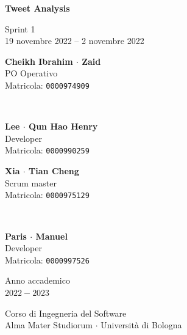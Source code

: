 \documentclass[11pt]{article}
\begin{document}
\begin{titlepage}
    \begin{center}
        \vspace*{1.5cm}
            
        \Huge
        \textbf{Tweet Analysis}
            
        \vspace{0.3cm}
        \LARGE
        Sprint 1\\[0.2em]
        \Large
        19 novembre 2022 -- 2 novembre 2022

        \vspace{1.5cm}
          
        \begin{minipage}[t]{0.47\textwidth}
            \begin{center}
                \parbox{50mm}{\centering\large {\bf Cheikh Ibrahim $\cdot$ Zaid} \\[0.2em] PO Operativo \\[0.3em] Matricola: \texttt{0000974909}}\\[2em]
                \parbox{50mm}{\centering\large {\bf Lee $\cdot$ Qun Hao Henry} \\[0.2em] Developer \\[0.3em] Matricola: \texttt{0000990259}}
            \end{center}
		\end{minipage}
		\hfill
		\begin{minipage}[t]{0.47\textwidth}\raggedleft
            \begin{center}
                \parbox{50mm}{\centering\large {\bf Xia $\cdot$ Tian Cheng} \\[0.2em] Scrum master \\[0.3em] Matricola: \texttt{0000975129}}\\[2em]
                \parbox{50mm}{\centering\large {\bf Paris $\cdot$ Manuel} \\[0.2em] Developer \\[0.3em] Matricola: \texttt{0000997526}}
            \end{center}
		\end{minipage}  
            
        \vspace{6cm}
            
        Anno accademico\\
        $2022 - 2023$
            
        \vspace{0.8cm}
            
            
        \Large
        Corso di Ingegneria del Software\\
        Alma Mater Studiorum $\cdot$ Università di Bologna\\
            
    \end{center}
\end{titlepage}
\pagebreak
\end{document}
